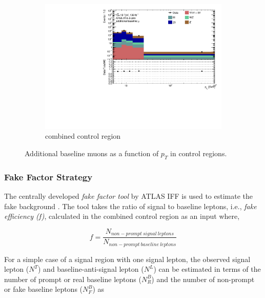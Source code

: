 \begin{figure}[!htb]
\begin{subfigure}{.48\textwidth}
    \end{subfigure} \\
    \begin{subfigure}{.48\textwidth}
        \centering
        \includegraphics[width=.9\linewidth]{figures/Analysis/Background/Overlay_pt_Baseline_muons_Combined.pdf}
        \caption{combined control region \label{fig:Add_mu_combined}}
    \end{subfigure}
        \caption{ Additional baseline muons as a function of $p_{T}$ in control regions. \label{fig:ControlRegionsAdditionalBaselineMuonpT}}
\end{figure}

\subsubsection{ Fake Factor Strategy }
\label{subsubsec:EstimationStrategy}

The centrally developed \textit{fake factor tool} by ATLAS IFF is used to estimate the fake background \cite{FakeBkgTool}. The tool takes the ratio of signal to baseline leptons, i.e., \textit{fake efficiency (f)}, calculated in the combined control region as an input where,

\begin{equation}
f = \frac{N_{non-prompt~signal~leptons}}{N_{non-prompt~baseline~leptons}}
\end{equation}

For a simple case of a signal region with one signal lepton, the observed signal lepton ($N^{T}$) and baseline-anti-signal lepton ($N^{L}$) can be estimated in terms of the number of prompt or real baseline leptons ($N^{B}_{R}$) and the number of non-prompt or fake baseline leptons ($N^{B}_{F}$) as

